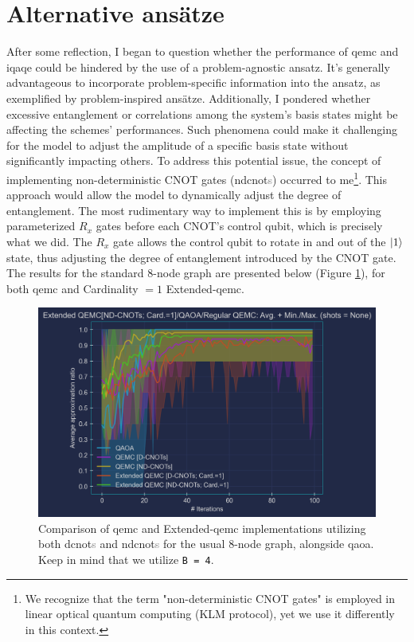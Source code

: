 \vspace*{-1cm}
\section{Alternative ansätze}
\label{section:Alternative_ansätze}

After some reflection, I began to question whether the performance of \acrshort{qemc} and \acrshort{iqaqe} could be hindered by the use of a problem-agnostic ansatz. It's generally advantageous to incorporate problem-specific information into the ansatz, as exemplified by problem-inspired ansätze. Additionally, I pondered whether excessive entanglement or correlations among the system's basis states might be affecting the schemes' performances. Such phenomena could make it challenging for the model to adjust the amplitude of a specific basis state without significantly impacting others. To address this potential issue, the concept of implementing non-deterministic CNOT gates (\acrshort{ndcnot}\textcolor{gray}{s}) occurred to me\footnote{We recognize that the term "non-deterministic CNOT gates" is employed in linear optical quantum computing (KLM protocol), yet we use it differently in this context.}. This approach would allow the model to dynamically adjust the degree of entanglement. The most rudimentary way to implement this is by employing parameterized $R_x$ gates before each CNOT's control qubit, which is precisely what we did. The $R_x$ gate allows the control qubit to rotate in and out of the $\ket{1}$ state, thus adjusting the degree of entanglement introduced by the CNOT gate. The results for the standard $8$-node graph are presented below (Figure \ref{fig:ND-CNOTs}), for both \acrshort{qemc} and Cardinality $= 1$ Extended-\acrshort{qemc}.
\begin{figure}[h]
  \centering
  \includegraphics[width=1.0\textwidth]{Figures/Chapter_5/Extended-QEMC/8-node[ND-CNOTs; Card.=1](n_layers=2, step_size=0.5).png}
  \caption{Comparison of \acrshort{qemc} and Extended-\acrshort{qemc} implementations utilizing both \acrshort{dcnot}\textcolor{gray}{s} and \acrshort{ndcnot}\textcolor{gray}{s} for the usual $8$-node graph, alongside \acrshort{qaoa}. Keep in mind that we utilize \texttt{B = 4}.}
  \label{fig:ND-CNOTs}
\end{figure}

